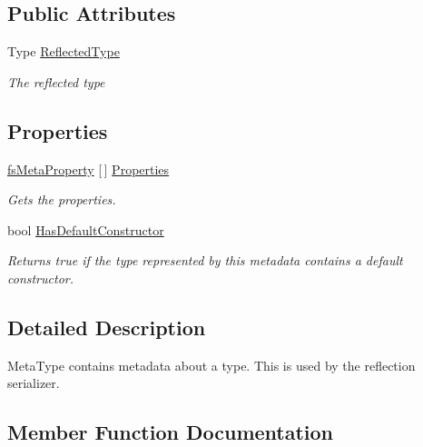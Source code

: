 \subsection*{Public Attributes}
\begin{DoxyCompactItemize}
\item 
Type \hyperlink{class_full_serializer_1_1fs_meta_type_ac130218d2834637c5c542f367b60cb42}{Reflected\+Type}
\begin{DoxyCompactList}\small\item\em The reflected type \end{DoxyCompactList}\end{DoxyCompactItemize}
\subsection*{Properties}
\begin{DoxyCompactItemize}
\item 
\hyperlink{class_full_serializer_1_1_internal_1_1fs_meta_property}{fs\+Meta\+Property} \mbox{[}$\,$\mbox{]} \hyperlink{class_full_serializer_1_1fs_meta_type_a313bb65ed53bfa38612dd1695365eebe}{Properties}
\begin{DoxyCompactList}\small\item\em Gets the properties. \end{DoxyCompactList}\item 
bool \hyperlink{class_full_serializer_1_1fs_meta_type_a52a664ae78a50823e1cca55d4a5cd12f}{Has\+Default\+Constructor}
\begin{DoxyCompactList}\small\item\em Returns true if the type represented by this metadata contains a default constructor. \end{DoxyCompactList}\end{DoxyCompactItemize}


\subsection{Detailed Description}
Meta\+Type contains metadata about a type. This is used by the reflection serializer. 



\subsection{Member Function Documentation}
\mbox{\label{class_full_serializer_1_1fs_meta_type_af2c4148ca9a3f9fe8d898e20035465b8}} 

